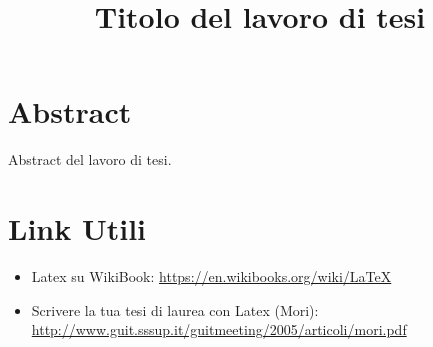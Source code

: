 \documentclass{mntesi}
\begin{document}
\onehalfspacing

\title{Titolo del lavoro di tesi} 
\frontespizio



\frontmatter
\chapter{Abstract}
Abstract del lavoro di tesi. 

\tableofcontents

\mainmatter




\chapter{Link Utili}
\begin{itemize}
	\item Latex su WikiBook: \url{https://en.wikibooks.org/wiki/LaTeX}
	
	\item Scrivere la tua tesi di laurea con Latex (Mori): \url{http://www.guit.sssup.it/guitmeeting/2005/articoli/mori.pdf}
\end{itemize}




\appendix




{}



\end{document}
